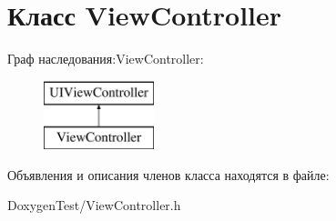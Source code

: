 \section{Класс View\+Controller}
\label{interface_view_controller}
Граф наследования\+:View\+Controller\+:\begin{figure}[H]
\begin{center}
\leavevmode
\includegraphics[height=2.000000cm]{interface_view_controller}
\end{center}
\end{figure}


Объявления и описания членов класса находятся в файле\+:\begin{DoxyCompactItemize}
\item 
Doxygen\+Test/View\+Controller.\+h\end{DoxyCompactItemize}
